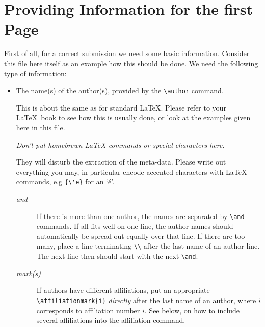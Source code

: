\documentclass[
submission
]{dmtcs-episciences}
\begin{document}
\clearpage
\section{Providing Information for the first Page}
\label{sec:first}

First of all, for a correct submission we need some basic information.
Consider this file here itself as an example how this should be done.
We need the following type of information:

\begin{itemize}
\item The name(s) of the author(s), provided by the \verb!\author!
  command.

  This is about the same as for standard \LaTeX. Please refer to
  your \LaTeX\ book to see how this is usually done, or look at the
  examples given here in this file. 
  
  \begin{center}
    \emph{Don't put homebrewn \LaTeX-commands or special characters here.}
  \end{center}

  They will disturb the extraction of the meta-data. Please write out
  everything you may, in particular encode accented characters with
  \LaTeX-commands, e.g \verb!{\'e}! for an `{\'e}'.

  \begin{description}
  \item[\emph{and}] If there is more than one author, the names are
    separated by \verb!\and! commands. If all fits well on one line,
    the author names should automatically be spread out equally over
    that line. If there are too many, place a line terminating
    \verb!\\!  after the last name of an author line. The next line
    then should start with the next \verb!\and!.
  \item[\emph{mark(s)}] If authors have different affiliations, put an
    appropriate \verb!\affiliationmark{i}!  \emph{directly} after the
    last name of an author, where $i$ corresponds to affiliation
    number $i$. See below, on how to include several affiliations into
    the affiliation command.


\end{description}
\end{itemize}
\end{document}
